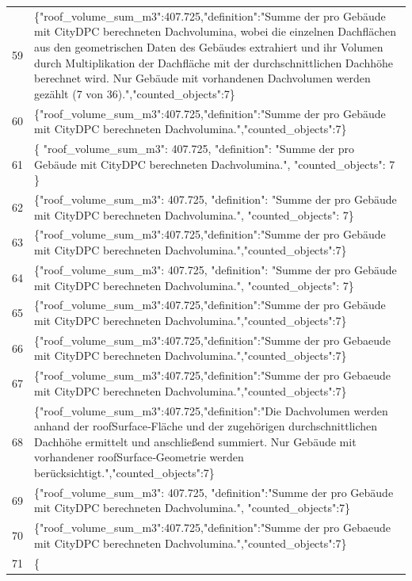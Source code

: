 \documentclass[a4paper,11pt]{article}
\begin{document}
\begin{table}[ht]
\begin{tabular}{r p{12cm}}
59 & \{"roof\_volume\_sum\_m3":407.725,"definition":"Summe der pro Gebäude mit CityDPC berechneten Dachvolumina, wobei die einzelnen Dachflächen aus den geometrischen Daten des Gebäudes extrahiert und ihr Volumen durch Multiplikation der Dachfläche mit der durchschnittlichen Dachhöhe berechnet wird. Nur Gebäude mit vorhandenen Dachvolumen werden gezählt (7 von 36).","counted\_objects":7\} \\
60 & \{"roof\_volume\_sum\_m3":407.725,"definition":"Summe der pro Gebäude mit CityDPC berechneten Dachvolumina.","counted\_objects":7\} \\
61 & \{
  "roof\_volume\_sum\_m3": 407.725,
  "definition": "Summe der pro Gebäude mit CityDPC berechneten Dachvolumina.",
  "counted\_objects": 7
\} \\
62 & \{"roof\_volume\_sum\_m3": 407.725, "definition": "Summe der pro Gebäude mit CityDPC berechneten Dachvolumina.", "counted\_objects": 7\} \\
63 & \{"roof\_volume\_sum\_m3":407.725,"definition":"Summe der pro Gebäude mit CityDPC berechneten Dachvolumina.","counted\_objects":7\} \\
64 & \{"roof\_volume\_sum\_m3": 407.725, "definition": "Summe der pro Gebäude mit CityDPC berechneten Dachvolumina.", "counted\_objects": 7\} \\
65 & \{"roof\_volume\_sum\_m3":407.725,"definition":"Summe der pro Gebäude mit CityDPC berechneten Dachvolumina.","counted\_objects":7\} \\
66 & \{"roof\_volume\_sum\_m3":407.725,"definition":"Summe der pro Gebaeude mit CityDPC berechneten Dachvolumina.","counted\_objects":7\} \\
67 & \{"roof\_volume\_sum\_m3":407.725,"definition":"Summe der pro Gebaeude mit CityDPC berechneten Dachvolumina.","counted\_objects":7\} \\
68 & \{"roof\_volume\_sum\_m3":407.725,"definition":"Die Dachvolumen werden anhand der roofSurface‑Fläche und der zugehörigen durchschnittlichen Dachhöhe ermittelt und anschließend summiert. Nur Gebäude mit vorhandener roofSurface‑Geometrie werden berücksichtigt.","counted\_objects":7\} \\
69 & \{"roof\_volume\_sum\_m3": 407.725, "definition":"Summe der pro Gebäude mit CityDPC berechneten Dachvolumina.", "counted\_objects":7\} \\
70 & \{"roof\_volume\_sum\_m3":407.725,"definition":"Summe der pro Gebaeude mit CityDPC berechneten Dachvolumina.","counted\_objects":7\} \\
71 & \{

\end{tabular}
\end{table}
\end{document}
